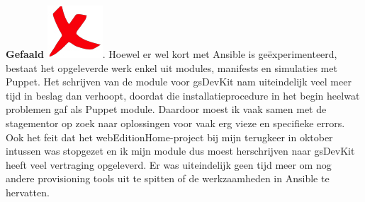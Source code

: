 \documentclass[a4paper,11pt]{article}
\theoremstyle{definition}
\begin{document}
\begin{enumerate}
    \noindent \textbf{Gefaald} \includegraphics[scale=0.15]{gefaald.jpg}. Hoewel er wel kort
    met Ansible is geëxperimenteerd, bestaat het opgeleverde werk enkel uit 
    modules, manifests en simulaties met Puppet. Het schrijven van de module 
    voor gsDevKit nam uiteindelijk veel meer tijd in beslag dan verhoopt, 
    doordat die installatieprocedure in het begin heelwat problemen gaf als Puppet module.  Daardoor moest ik vaak
    samen met de stagementor op zoek naar oplossingen voor vaak erg vieze en specifieke errors. Ook het feit dat het webEditionHome-project
    bij mijn terugkeer in oktober intussen was stopgezet en ik mijn module dus moest herschrijven naar gsDevKit heeft veel vertraging opgeleverd. Er was uiteindelijk geen
    tijd meer om nog andere provisioning tools uit te spitten of de 
    werkzaamheden in Ansible te hervatten.
       \end{enumerate}
    
\end{document}
